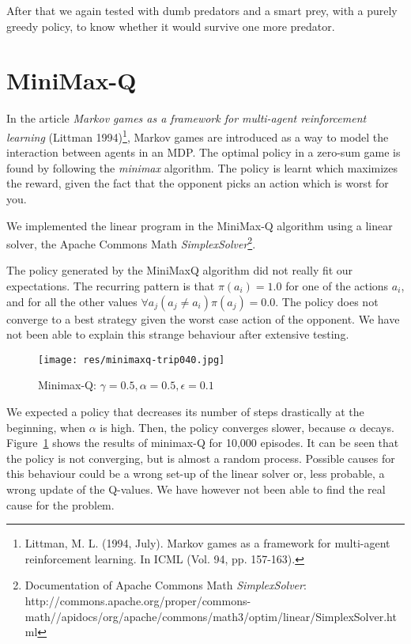 \documentclass{article}
\begin{document}
After that we again tested with dumb predators and a smart prey, with a purely greedy policy, to
know whether it would survive one more predator.



\section{MiniMax-Q}
In the article \emph{Markov games as a framework for multi-agent reinforcement learning} (Littman 1994)\footnote{Littman, M. L. (1994, July). Markov games as a framework for multi-agent reinforcement learning. In ICML (Vol. 94, pp. 157-163).}, Markov games are introduced as a way to model the interaction between agents in an MDP. The optimal policy in a zero-sum game is found by following the \emph{minimax} algorithm. The policy is learnt which maximizes the reward, given the fact that the opponent picks an action which is worst for you.

We implemented the linear program in the MiniMax-Q algorithm using a linear solver, the Apache Commons Math \emph{SimplexSolver}\footnote{Documentation of Apache Commons Math \emph{SimplexSolver}: http://commons.apache.org/proper/commons-math//apidocs/org/apache/commons/math3/optim/linear/SimplexSolver.html}.

The policy generated by the MiniMaxQ algorithm did not really fit our expectations. The recurring pattern is that $\pi(a_i) = 1.0$ for one of the actions $a_i$, and for all the other values $\forall a_j (a_j \neq a_i) \pi(a_j) = 0.0$. The policy does not converge to a best strategy given the worst case action of the opponent. We have not been able to explain this strange behaviour after extensive testing. 

\begin{figure}[!h]
\texttt{[image: res/minimaxq-trip040.jpg]}
\caption{Minimax-Q: $\gamma=0.5, \alpha = 0.5, \epsilon = 0.1$}
\label{fig:minimaxq}
\end{figure}

We expected a policy that decreases its number of steps drastically at the beginning, when $\alpha$ is high. Then, the policy converges slower, because $\alpha$ decays. Figure~\ref{fig:minimaxq} shows the results of minimax-Q for 10,000 episodes. It can be seen that the policy is not converging, but is almost a random process. Possible causes for this behaviour could be a wrong set-up of the linear solver or, less probable, a wrong update of the Q-values. We have however not been able to find the real cause for the problem. %
\end{document}
